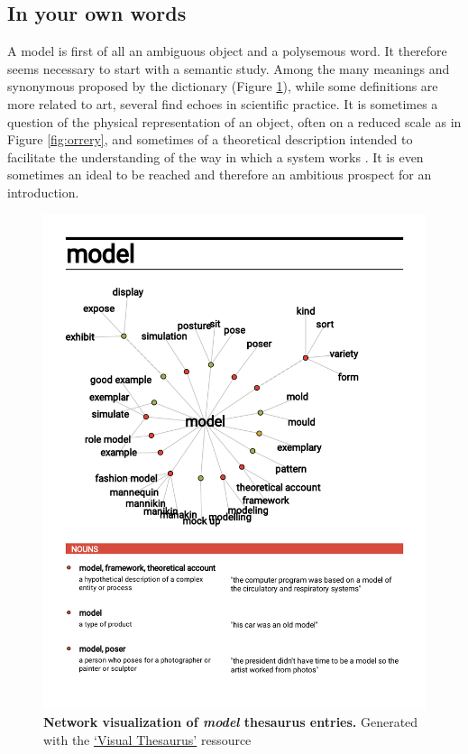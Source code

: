 \documentclass[a4paper,12pt,twoside,onecolumn,openright,final,oldfontcommands]{memoir}
\begin{document}
\subsection{In your own words}\label{in-your-own-words}

A model is first of all an ambiguous object and a polysemous word. It
therefore seems necessary to start with a semantic study. Among the many
meanings and synonymous proposed by the dictionary (Figure
\ref{fig:visual-thesaurus}), while some definitions are more related to
art, several find echoes in scientific practice. It is sometimes a
question of the physical representation of an object, often on a reduced
scale as in Figure \ref{fig:orrery}, and sometimes of a theoretical
description intended to facilitate the understanding of the way in which
a system works \citep{dictionnarymodel}. It is even sometimes an ideal
to be reached and therefore an ambitious prospect for an introduction.

\begin{figure}

{\centering \includegraphics[width=0.9\linewidth]{fig/visualThesaurus} 

}

\caption[Network visualization of *model* thesaurus entries]{\textbf{Network visualization of
\emph{model} thesaurus entries.} Generated with the
\href{https://www.visualthesaurus.com}{`Visual Thesaurus'} ressource}\label{fig:visual-thesaurus}
\end{figure}
\end{document}
